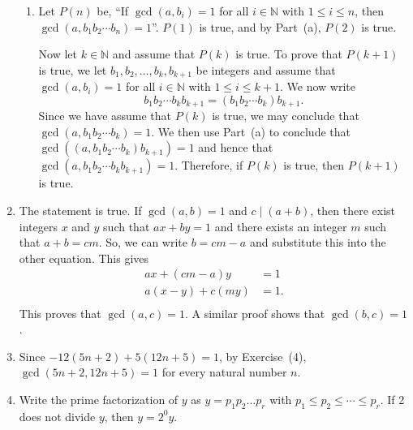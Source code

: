 \begin{enumerate}
\begin{enumerate}
\item Let $P \left( n \right)$ be, ``If  $\gcd \left( {a, b_i } \right) = 1$ for all  
$i \in \mathbb{N}$ with  $1 \leq i \leq n$, then  
$\gcd \left( {a, b_1 b_2  \cdots b_n } \right) = 1$''.  $P \left( 1 \right)$ is true, and by 
Part~(a), $P \left( 2 \right)$ is true.

Now let $k \in \mathbb{N}$ and assume that $P \left( k \right)$ is true.  To prove that 
$P \left( k + 1 \right)$ is true, we let $b_1, b_2, \ldots, b_k, b_{k+1}$ be integers and assume that \\
$\gcd \left( {a, b_i } \right) = 1$ for all  $i \in \mathbb{N}$ with  $1 \leq i \leq k+1$.  We now write
\[
b_1 b_2  \cdots b_k b_{k+1} = \left( b_1 b_2  \cdots b_k \right) b_{k+1}.
\] 
Since we have assume that $P \left( k \right)$ is true, we may conclude that 
$\gcd \left( {a, b_1 b_2  \cdots b_k } \right) = 1$.  We then use Part~(a) to conclude that \\
$\gcd \left( \left( {a, b_1 b_2  \cdots b_k } \right)b_{k+1} \right) = 1$ and hence that \\
$\gcd \left( a, b_1 b_2  \cdots b_k b_{k+1} \right) = 1$.  Therefore, if $P \left( k \right)$ is true, then $P \left( k + 1 \right)$ is true.
\end{enumerate}

\item The statement is true.  If   $\gcd \left( {a, b} \right) = 1$  and  
$c \mid \left( {a + b} \right)$, then there exist integers $x$ and $y$ such that 
$ax + by = 1$ and there exists an integer $m$ such that $a + b = cm$.  So, we can write 
$b = cm - a$ and substitute this into the other equation.  This gives
\[
\begin{aligned}
              ax + \left( cm - a \right) y &= 1 \\
a \left( x - y \right) + c \left( my \right) &= 1. \\
\end{aligned}
\]
This proves that $\gcd \left( a, c \right) = 1$.  A similar proof shows that 
$\gcd \left( b, c \right) = 1$.

\item Since $-12 \left( 5n + 2 \right) + 5 \left( 12n + 5 \right) = 1$, by Exercise~(4), 
$\gcd \left( 5n + 2, 12n + 5 \right) = 1$ for every natural number $n$.

\item Write the prime factorization of $y$ as $y = p_1 p_2 \ldots p_r$ with 
$p_1 \leq p_2 \leq \cdots \leq p_r$.  If 2 does not divide $y$, then
$y = 2^0 y$.


\end{enumerate}
